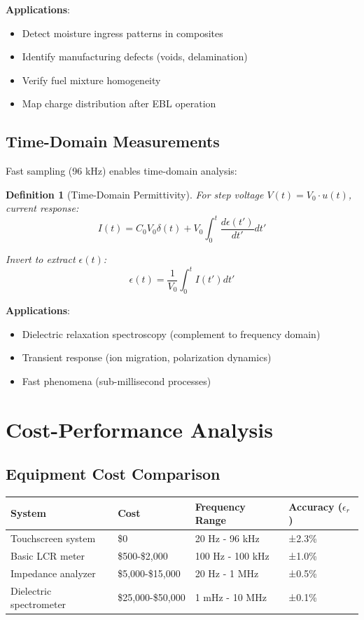 \documentclass[12pt,a4paper]{article}
\newtheorem{definition}{Definition}
\begin{document}
\textbf{Applications}:
\begin{itemize}
\item Detect moisture ingress patterns in composites
\item Identify manufacturing defects (voids, delamination)
\item Verify fuel mixture homogeneity
\item Map charge distribution after EBL operation
\end{itemize}

\subsection{Time-Domain Measurements}

Fast sampling (96 kHz) enables time-domain analysis:

\begin{definition}[Time-Domain Permittivity]
For step voltage $V(t) = V_0 \cdot u(t)$, current response:
\begin{equation}
I(t) = C_0 V_0 \delta(t) + V_0 \int_0^t \frac{d\epsilon(t')}{dt'} dt'
\end{equation}

Invert to extract $\epsilon(t)$:
\begin{equation}
\epsilon(t) = \frac{1}{V_0} \int_0^t I(t') dt'
\end{equation}
\end{definition}

\textbf{Applications}:
\begin{itemize}
\item Dielectric relaxation spectroscopy (complement to frequency domain)
\item Transient response (ion migration, polarization dynamics)
\item Fast phenomena (sub-millisecond processes)
\end{itemize}

\section{Cost-Performance Analysis}

\subsection{Equipment Cost Comparison}

\begin{center}
\begin{tabular}{|l|l|l|l|}
\hline
\textbf{System} & \textbf{Cost} & \textbf{Frequency Range} & \textbf{Accuracy ($\epsilon_r$)} \\
\hline
Touchscreen system & \$0 & 20 Hz - 96 kHz & ±2.3\% \\
Basic LCR meter & \$500-\$2,000 & 100 Hz - 100 kHz & ±1.0\% \\
Impedance analyzer & \$5,000-\$15,000 & 20 Hz - 1 MHz & ±0.5\% \\
Dielectric spectrometer & \$25,000-\$50,000 & 1 mHz - 10 MHz & ±0.1\% \\
\hline
\end{tabular}
\end{center}
\end{document}
